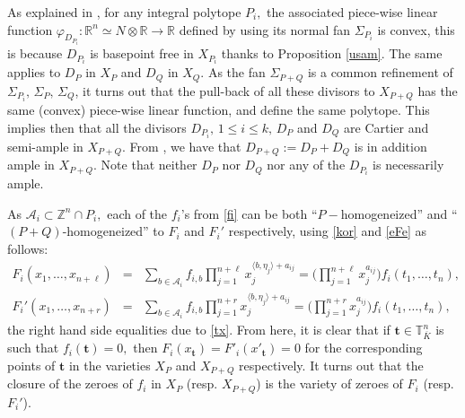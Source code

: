 \documentclass[a4paper,11pt]{amsart}
\newcommand{\R}{\mathbb{R}}
\newcommand{\T}{\mathbb{T}}
\newcommand{\Z}{\mathbb{Z}}
\newcommand{\cA}{{\mathcal A}}
\newcommand{\bft}{{\boldsymbol{t}}}
\numberwithin{thm}{section}
\numberwithin{equation}{section}
\theoremstyle{definition}
\theoremstyle{plain}
\begin{document}
As explained in \cite[\S $2.2$]{KS05}, for any integral polytope $P_i,$ the associated piece-wise linear function $\varphi_{D_{P_i}}:\R^n\simeq N\otimes\R\to\R$ defined by using its normal fan $\Sigma_{P_i}$ is convex, this is because $D_{P_i}$ is basepoint free in $X_{P_i}$ thanks to Proposition \ref{usam}.
The same applies to $D_P$ in $X_P$ and $D_Q$ in $X_Q$. As the fan $\Sigma_{P+Q}$ is a common refinement of $\Sigma_{P_i},\,\Sigma_P,\,\Sigma_Q$, it turns out that the pull-back of all these divisors to $X_{P+Q}$  has the same  (convex) piece-wise linear function, and define the same polytope.  This implies then that all the divisors $D_{P_i},\,1\leq i\leq k,\, D_P$ and $D_Q$ are Cartier and semi-ample in $X_{P+Q}.$ From \cite[Proposition 6.1.10]{CLS11}, we have that $D_{P+Q}:=D_P+D_Q$ is in addition ample in $X_{P+Q}.$ Note that neither $D_P$ nor $D_Q$ nor any of the $D_{P_i}$ is necessarily  ample.


As $\cA_i\subset\Z^n\cap P_i,$ each of the $f_i$'s  from \eqref{fi} can be  both ``$P-$homogeneized'' and ``$(P+Q)$-homogeneized''  to $F_i$  and $F_i'$ respectively, using \eqref{kor} and \eqref{eFe} as follows:
\begin{equation}\label{eFFe}
\begin{array}{ccl}
F_i(x_1,\ldots, x_{n+\ell})&=&\sum_{b\in\cA_i} f_{i,b}\prod_{j=1}^{n+\ell}x_j^{\langle b,\eta_j\rangle+a_{ij}}=\Big(\prod_{j=1}^{n+\ell}x_j^{a_{ij}}\Big)f_i(t_1,\ldots, t_n),\\
F_i'(x_1,\ldots, x_{n+r})&=&\sum_{b\in\cA_i} f_{i,b}\prod_{j=1}^{n+r}x_j^{\langle b,\eta_j\rangle+a_{ij}}=\Big(\prod_{j=1}^{n+r}x_j^{a_{ij}}\Big)f_i(t_1,\ldots, t_n),
\end{array}
\end{equation}
the right hand side equalities  due to \eqref{tx}. From here, it is clear that if $\bft\in\T_{\overline{K}}^n$ is such that $f_i(\bft)=0,$ then $F_i(x_\bft)=F'_i(x'_\bft)=0$ for the corresponding points of $\bft$ in the varieties $X_P$ and $X_{P+Q}$ respectively.   It turns out that the closure of the zeroes of $f_i$ in $X_P$ (resp. $X_{P+Q}$) is the variety of zeroes of $F_i$ (resp. $F_i'$).
\end{document}
